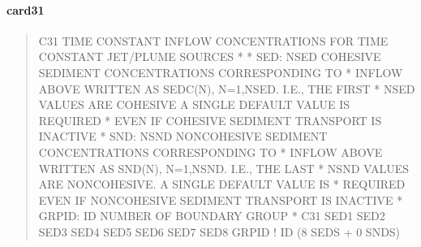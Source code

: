\documentclass[letterpaper,10pt,english]{sphinxmanual}
\begin{document}
\paragraph{card31}
\label{\detokenize{inputfiles/runcontrol/card31:card31}}\label{\detokenize{inputfiles/runcontrol/card31::doc}}\begin{quote}

\begin{sphinxVerbatim}[commandchars=\\\{\}]
\PYGZhy{}\PYGZhy{}\PYGZhy{}\PYGZhy{}\PYGZhy{}\PYGZhy{}\PYGZhy{}\PYGZhy{}\PYGZhy{}\PYGZhy{}\PYGZhy{}\PYGZhy{}\PYGZhy{}\PYGZhy{}\PYGZhy{}\PYGZhy{}\PYGZhy{}\PYGZhy{}\PYGZhy{}\PYGZhy{}\PYGZhy{}\PYGZhy{}\PYGZhy{}\PYGZhy{}\PYGZhy{}\PYGZhy{}\PYGZhy{}\PYGZhy{}\PYGZhy{}\PYGZhy{}\PYGZhy{}\PYGZhy{}\PYGZhy{}\PYGZhy{}\PYGZhy{}\PYGZhy{}\PYGZhy{}\PYGZhy{}\PYGZhy{}\PYGZhy{}\PYGZhy{}\PYGZhy{}\PYGZhy{}\PYGZhy{}\PYGZhy{}\PYGZhy{}\PYGZhy{}\PYGZhy{}\PYGZhy{}\PYGZhy{}\PYGZhy{}\PYGZhy{}\PYGZhy{}\PYGZhy{}\PYGZhy{}\PYGZhy{}\PYGZhy{}\PYGZhy{}\PYGZhy{}\PYGZhy{}\PYGZhy{}\PYGZhy{}\PYGZhy{}\PYGZhy{}\PYGZhy{}\PYGZhy{}\PYGZhy{}\PYGZhy{}\PYGZhy{}\PYGZhy{}\PYGZhy{}\PYGZhy{}\PYGZhy{}\PYGZhy{}\PYGZhy{}\PYGZhy{}\PYGZhy{}\PYGZhy{}
C31 TIME CONSTANT INFLOW CONCENTRATIONS FOR TIME CONSTANT JET/PLUME SOURCES
*
*    SED: NSED COHESIVE SEDIMENT CONCENTRATIONS CORRESPONDING TO
*         INFLOW ABOVE  WRITTEN AS SEDC(N), N=1,NSED. I.E., THE FIRST
*         NSED VALUES ARE COHESIVE A SINGLE DEFAULT VALUE IS REQUIRED
*         EVEN IF COHESIVE SEDIMENT TRANSPORT IS INACTIVE
*    SND: NSND NON\PYGZhy{}COHESIVE SEDIMENT CONCENTRATIONS CORRESPONDING TO
*         INFLOW ABOVE  WRITTEN AS SND(N), N=1,NSND. I.E., THE LAST
*         NSND VALUES ARE NON\PYGZhy{}COHESIVE. A SINGLE DEFAULT VALUE IS
*         REQUIRED EVEN IF NON\PYGZhy{}COHESIVE SEDIMENT TRANSPORT IS INACTIVE
*  GRPID: ID NUMBER OF BOUNDARY GROUP
*
C31      SED1      SED2      SED3      SED4      SED5      SED6      SED7      SED8      GRPID ! ID (8 SEDS + 0 SNDS)
\end{sphinxVerbatim}
\end{quote}
\end{document}
